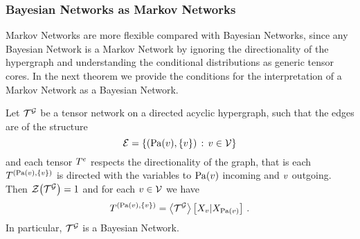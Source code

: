 \subsubsection{Bayesian Networks as Markov Networks}

Markov Networks are more flexible compared with Bayesian Networks, since any Bayesian Network is a Markov Network by ignoring the directionality of the hypergraph and understanding the conditional distributions as generic tensor cores.
In the next theorem we provide the conditions for the interpretation of a Markov Network as a Bayesian Network.

\begin{theorem}\label{the:MarkovToBayesian}
	Let $\mathcal{T}^{\mathcal{G}}$ be a tensor network on a directed acyclic hypergraph, such that the edges are of the structure
		\[ \mathcal{E} = \{(\mathrm{Pa}(v),\{v\}) \, : \, v\in\mathcal{V}\} \]
	and each tensor $T^{e}$ respects the directionality of the graph, that is each $T^{(\mathrm{Pa}(v), \{v\})}$ is directed with the variables to $\mathrm{Pa}(v)$ incoming and $v$ outgoing.
	Then $\mathcal{Z}{\left(\mathcal{T}^{\mathcal{G}}\right)}=1$ and for each $v\in\mathcal{V}$ we have
		\[ T^{(\mathrm{Pa}(v),\{v\})} = \left\langle \mathcal{T}^{\mathcal{G}}\right\rangle \left[ X_{v} | X_{\mathrm{Pa}(v)} \right] \, . \]
	In particular, $\mathcal{T}^{\mathcal{G}}$ is a Bayesian Network.
\end{theorem}
